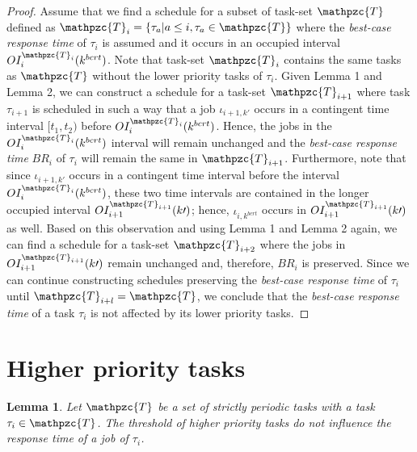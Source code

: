 \documentclass[fleqn]{article}
\newtheorem{lemma}{Lemma}
\begin{document}
\begin{proof}
	Assume that we find a schedule for a subset of task-set $\mathpzc{T}$ defined as $\mathpzc{T}_i = \{\tau_a | a \leq i, \tau_a \in \mathpzc{T}\}$ where the \textit{best-case response time} of $\tau_i$ is assumed and it occurs in an occupied interval $OI^{\mathpzc{T}_i}_i(k^{bcrt})$. Note that task-set $\mathpzc{T}_i$ contains the same tasks as $\mathpzc{T}$ without the lower priority tasks of $\tau_i$. Given Lemma 1 and Lemma 2, we can construct a schedule for a task-set $\mathpzc{T}_{i+1}$ where task $\tau_{i+1}$ is scheduled in such a way that a job $\iota_{i+1, k\prime}$ occurs in a contingent time interval $[t_1, t_2)$ before $OI^{\mathpzc{T}_i}_i(k^{bcrt})$. Hence, the jobs in the $OI^{\mathpzc{T}_i}_i(k^{bcrt})$ interval will remain unchanged and the \textit{best-case response time} $BR_i$ of $\tau_i$ will remain the same in $\mathpzc{T}_{i+1}$. Furthermore, note that since $\iota_{i+1, k\prime}$ occurs in a contingent time interval before the interval $OI^{\mathpzc{T}_i}_i(k^{bcrt})$, these two time intervals are contained in the longer occupied interval $OI^{\mathpzc{T}_{i+1}}_{i+1}(k\prime)$; hence, $\iota_{i, k^{bcrt}}$ occurs in $OI^{\mathpzc{T}_{i+1}}_{i+1}(k\prime)$ as well. Based on this observation and using Lemma 1 and Lemma 2 again, we can find a schedule for a task-set $\mathpzc{T}_{i+2}$ where the jobs in $OI^{\mathpzc{T}_{i+1}}_{i+1}(k\prime)$ remain unchanged and, therefore, $BR_i$ is preserved. Since we can continue constructing schedules preserving the \textit{best-case response time} of $\tau_i$ until $\mathpzc{T}_{i+l} = \mathpzc{T}$, we conclude that the \textit{best-case response time} of a task $\tau_i$ is not affected by its lower priority tasks.
\end{proof}

\section{Higher priority tasks}

\begin{lemma}
	Let $\mathpzc{T}$ be a set of strictly periodic tasks with a task $\tau_i \in \mathpzc{T}$. The threshold of higher priority tasks do not influence the response time of a job of $\tau_i$.
\end{lemma}
\end{document}
